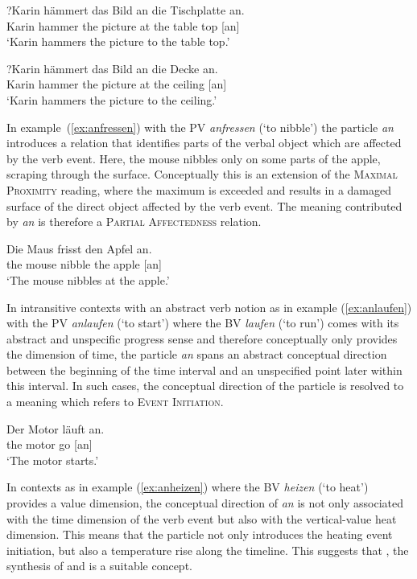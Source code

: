 \documentclass[output=paper]{langsci/langscibook}
\begin{document}
\ea\label{ex:anhaemmernTischplatte}
\gll ?Karin hämmert das Bild an die Tischplatte an.\\
Karin hammer the picture at the {table top} [an]\\
\glt `Karin hammers the picture to the table top.'
\z

\ea\label{ex:anhaemmernDecke}
\gll ?Karin hämmert das Bild an die Decke an.\\
Karin hammer the picture at the ceiling [an]\\
\glt `Karin hammers the picture to the ceiling.'
\z

In example~(\ref{ex:anfressen}) with the PV \textit{anfressen} (`to
nibble') the particle \textit{an} introduces a relation that
identifies parts of the verbal object which are affected by the verb
event. Here, the mouse nibbles only on some parts of the apple,
scraping through the surface. Conceptually this is an extension of the
\textsc{Maximal Proximity} reading, where the maximum is exceeded and
results in a damaged surface of the direct object affected by the verb
event. The meaning contributed by \textit{an} is therefore a
\textsc{Partial Affectedness} relation.

\ea\label{ex:anfressen}
\gll Die Maus frisst den Apfel an.\\
the mouse nibble the apple [an]\\
\glt `The mouse nibbles at the apple.'
\z

In intransitive contexts with an abstract verb notion as in example
(\ref{ex:anlaufen}) with the PV \textit{anlaufen} (`to start') where
the BV \textit{laufen} (`to run') comes with its abstract and
unspecific progress sense and therefore conceptually only provides the
dimension of time, the particle \textit{an} spans an abstract
conceptual direction between the beginning of the time interval and an
unspecified point later within this interval. In such cases, the
conceptual direction of the particle is resolved to a meaning which
refers to \textsc{Event Initiation}.

\ea\label{ex:anlaufen}
\gll Der Motor läuft an.\\
the motor go [an]\\
\glt `The motor starts.'
\z

In contexts as in example (\ref{ex:anheizen}) where the BV
\textit{heizen} (`to heat') provides a value dimension, the conceptual
direction of \textit{an} is not only associated with the time
dimension of the verb event but also with the vertical-value heat
dimension. This means that the particle not only introduces the
heating event initiation, but also a temperature rise along the
timeline. This suggests that , the synthesis of
 and  is a suitable concept.
\end{document}
